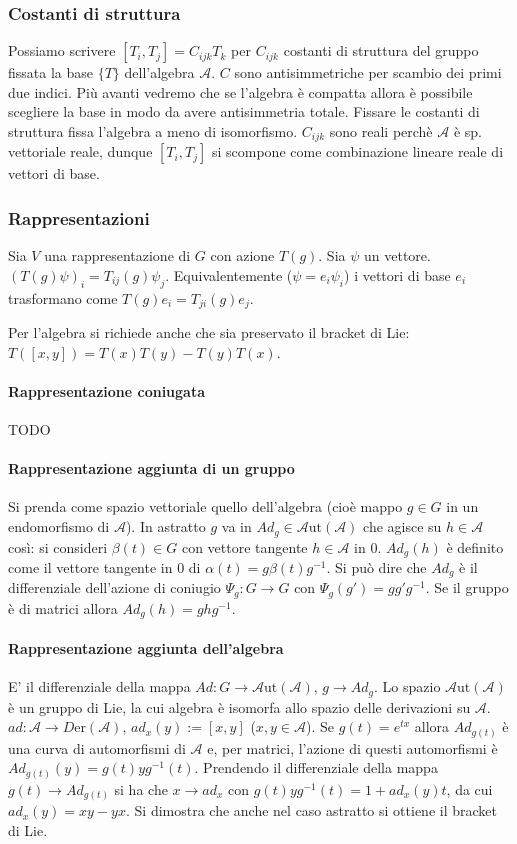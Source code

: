 \documentclass[12pt,oneside,notitlepage,abstracton,a4paper]{scrartcl}
\newcommand{\A}{\mathcal{A}}
\begin{document}
\subsubsection{Costanti di struttura}
Possiamo scrivere $[T_i,T_j] = C_{ijk} T_k$ per $C_{ijk}$ costanti di struttura del gruppo fissata la base $\{T\}$ dell'algebra $\A$. $C$ sono antisimmetriche per scambio dei primi due indici. Più avanti vedremo che se l'algebra è compatta allora è possibile scegliere la base in modo da avere antisimmetria totale. Fissare le costanti di struttura fissa l'algebra a meno di isomorfismo. $C_{ijk}$ sono reali perchè $\A$ è sp. vettoriale reale, dunque $[T_i,T_j]$ si scompone come combinazione lineare reale di vettori di base.

\subsubsection{Rappresentazioni} Sia $V$ una rappresentazione di $G$ con azione $T(g)$. Sia $\psi$ un vettore. $(T(g) \psi)_i = T_{ij}(g) \psi_j$. Equivalentemente ($\psi = e_i \psi_i$) i vettori di base $e_i$ trasformano come $T(g)e_i = T_{ji}(g) e_j$.

Per l'algebra si richiede anche che sia preservato il bracket di Lie: $T([x,y]) = T(x)T(y)-T(y)T(x)$.

\paragraph{Rappresentazione coniugata} TODO

\paragraph{Rappresentazione aggiunta di un gruppo} Si prenda come spazio vettoriale quello dell'algebra (cioè mappo $g\in G$ in un endomorfismo di $\A$). In astratto $g$ va in $Ad_g \in \A \mathrm{ut}(\A)$ che agisce su $h\in \A$ così: si consideri $\beta(t)\in G$ con vettore tangente $h\in \A$ in 0. $Ad_g(h)$ è definito come il vettore tangente in 0 di $\alpha(t) = g\beta(t) g^{-1}$. Si può dire che $Ad_g$ è il differenziale dell'azione di coniugio $\Psi_g: G\rightarrow G$ con $\Psi_g(g') = gg'g^{-1}$. Se il gruppo è di matrici allora $Ad_g(h) = ghg^{-1}$.

\paragraph{Rappresentazione aggiunta dell'algebra} E' il differenziale della mappa $Ad: G\rightarrow \A \mathrm{ut}(\A)$, $g\rightarrow Ad_g$. Lo spazio $\A \mathrm{ut}(\A)$ è un gruppo di Lie, la cui algebra è isomorfa allo spazio delle derivazioni su $\A$. $ad: \A \rightarrow D\mathrm{er}(\A)$, $ad_x(y) := [x,y]$ ($x,y\in \A$). Se $g(t) = e^{tx}$ allora $Ad_{g(t)}$ è una curva di automorfismi di $\A$ e, per matrici, l'azione di questi automorfismi è $Ad_{g(t)}(y) = g(t) y g^{-1}(t)$. Prendendo il differenziale della mappa $g(t) \rightarrow Ad_{g(t)}$ si ha che $x \rightarrow ad_x$ con $g(t) y g^{-1}(t) = 1 + ad_x(y) t$, da cui $ad_x(y) = xy-yx$. Si dimostra che anche nel caso astratto si ottiene il bracket di Lie.
\end{document}
